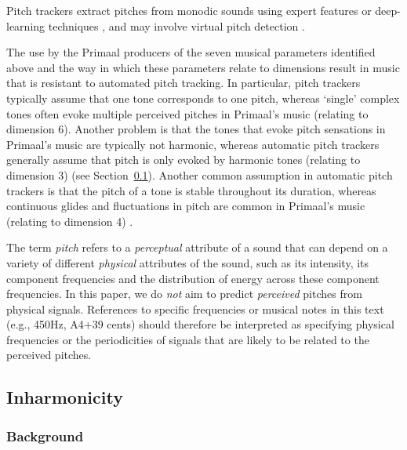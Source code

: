 \documentclass{article}
\begin{document}
Pitch trackers extract pitches from monodic sounds using expert features \citep{drugman2018traditional} or deep-learning techniques \citep{kim2018crepe, riou2023pesto}, and may involve virtual pitch detection \citep{terhardt1979calculating, meddis2006virtual}.

The use by the Primaal producers of the seven musical parameters identified above and the way in which these parameters relate to  dimensions result in music that is resistant to automated pitch tracking. In particular, pitch trackers typically assume that one tone corresponds to one pitch, whereas `single' complex tones often evoke multiple perceived pitches in Primaal's music (relating to  dimension 6). Another problem is that the tones that evoke pitch sensations in Primaal's music are typically not harmonic, whereas automatic pitch trackers generally assume that pitch is only evoked by harmonic tones (relating to  dimension 3)
(see Section~\ref{sec:inharmonicity}). Another common assumption in automatic pitch trackers is that the pitch of a tone is stable throughout its duration, whereas continuous glides and fluctuations in pitch are common in Primaal's music (relating to  dimension 4)
\citep[p.~21]{benetos2018automatic}.

The term {\em pitch\/} refers to a {\em perceptual\/} attribute of a sound that can depend on a variety of different {\em physical\/} attributes of the sound, such as its intensity, its component frequencies and the distribution of energy across these component frequencies. In this paper, we do {\em not\/} aim to predict \textit{perceived} pitches from physical signals. References to specific frequencies or musical notes in this text (e.g., 450Hz, A4+39 cents) should therefore be interpreted as specifying physical frequencies or the periodicities of signals that are likely to be related to the perceived pitches.

\subsection{Inharmonicity}\label{sec:inharmonicity}

\subsubsection{Background}\label{sec:inharmonicitybackground}
\end{document}
